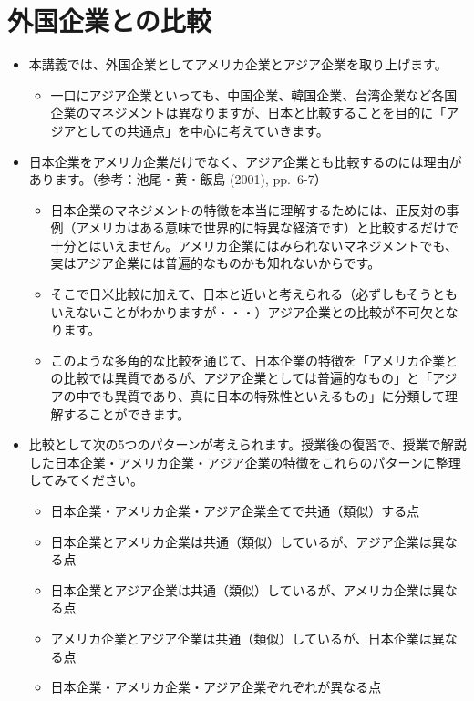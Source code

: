 \documentclass[
]{book}
\providecommand{\tightlist}{%
  \setlength{\itemsep}{0pt}\setlength{\parskip}{0pt}}
\begin{document}
\hypertarget{comparizon}{%
\section{外国企業との比較}\label{comparizon}}

\begin{itemize}
\item
  本講義では、外国企業としてアメリカ企業とアジア企業を取り上げます。

  \begin{itemize}
  \tightlist
  \item
    一口にアジア企業といっても、中国企業、韓国企業、台湾企業など各国企業のマネジメントは異なりますが、日本と比較することを目的に「アジアとしての共通点」を中心に考えていきます。\\
  \end{itemize}
\item
  日本企業をアメリカ企業だけでなく、アジア企業とも比較するのには理由があります。（参考：池尾・黄・飯島 (2001), pp.~6-7）

  \begin{itemize}
  \item
    日本企業のマネジメントの特徴を本当に理解するためには、正反対の事例（アメリカはある意味で世界的に特異な経済です）と比較するだけで十分とはいえません。アメリカ企業にはみられないマネジメントでも、実はアジア企業には普遍的なものかも知れないからです。
  \item
    そこで日米比較に加えて、日本と近いと考えられる（必ずしもそうともいえないことがわかりますが・・・）アジア企業との比較が不可欠となります。
  \item
    このような多角的な比較を通じて、日本企業の特徴を「アメリカ企業との比較では異質であるが、アジア企業としては普遍的なもの」と「アジアの中でも異質であり、真に日本の特殊性といえるもの」に分類して理解することができます。
  \end{itemize}
\item
  比較として次の5つのパターンが考えられます。授業後の復習で、授業で解説した日本企業・アメリカ企業・アジア企業の特徴をこれらのパターンに整理してみてください。

  \begin{itemize}
  \item
    日本企業・アメリカ企業・アジア企業全てで共通（類似）する点
  \item
    日本企業とアメリカ企業は共通（類似）しているが、アジア企業は異なる点
  \item
    日本企業とアジア企業は共通（類似）しているが、アメリカ企業は異なる点
  \item
    アメリカ企業とアジア企業は共通（類似）しているが、日本企業は異なる点
  \item
    日本企業・アメリカ企業・アジア企業ぞれぞれが異なる点
  \end{itemize}
\end{itemize}
\end{document}
